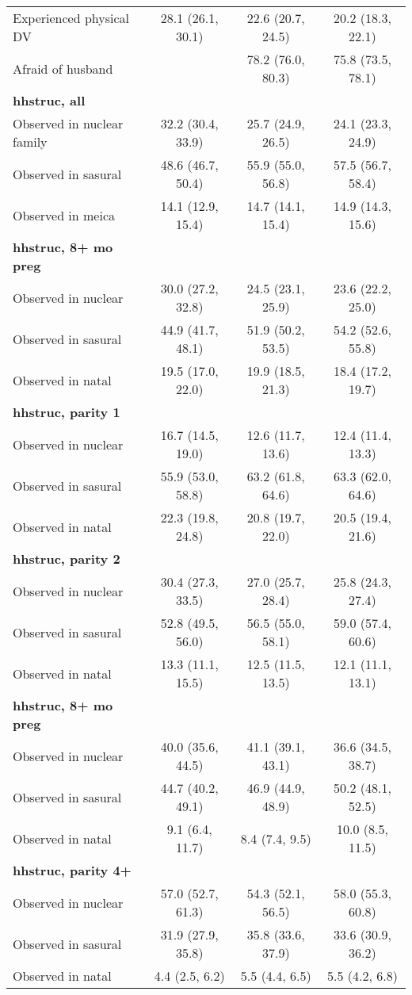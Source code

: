 \begin{tabular}{lccc}
Experienced physical DV&28.1 (26.1, 30.1)&22.6 (20.7, 24.5)&20.2 (18.3, 22.1)\\
Afraid of husband&&78.2 (76.0, 80.3)&75.8 (73.5, 78.1)\\
\textbf{hhstruc, all}&&&\\
Observed in nuclear family&32.2 (30.4, 33.9)&25.7 (24.9, 26.5)&24.1 (23.3, 24.9)\\
Observed in sasural&48.6 (46.7, 50.4)&55.9 (55.0, 56.8)&57.5 (56.7, 58.4)\\
Observed in meica&14.1 (12.9, 15.4)&14.7 (14.1, 15.4)&14.9 (14.3, 15.6)\\
\textbf{hhstruc, 8+ mo preg}&&&\\
Observed in nuclear&30.0 (27.2, 32.8)&24.5 (23.1, 25.9)&23.6 (22.2, 25.0)\\
Observed in sasural&44.9 (41.7, 48.1)&51.9 (50.2, 53.5)&54.2 (52.6, 55.8)\\
Observed in natal&19.5 (17.0, 22.0)&19.9 (18.5, 21.3)&18.4 (17.2, 19.7)\\
\textbf{hhstruc, parity 1}&&&\\
Observed in nuclear&16.7 (14.5, 19.0)&12.6 (11.7, 13.6)&12.4 (11.4, 13.3)\\
Observed in sasural&55.9 (53.0, 58.8)&63.2 (61.8, 64.6)&63.3 (62.0, 64.6)\\
Observed in natal&22.3 (19.8, 24.8)&20.8 (19.7, 22.0)&20.5 (19.4, 21.6)\\
\textbf{hhstruc, parity 2}&&&\\
Observed in nuclear&30.4 (27.3, 33.5)&27.0 (25.7, 28.4)&25.8 (24.3, 27.4)\\
Observed in sasural&52.8 (49.5, 56.0)&56.5 (55.0, 58.1)&59.0 (57.4, 60.6)\\
Observed in natal&13.3 (11.1, 15.5)&12.5 (11.5, 13.5)&12.1 (11.1, 13.1)\\
\textbf{hhstruc, 8+ mo preg}&&&\\
Observed in nuclear&40.0 (35.6, 44.5)&41.1 (39.1, 43.1)&36.6 (34.5, 38.7)\\
Observed in sasural&44.7 (40.2, 49.1)&46.9 (44.9, 48.9)&50.2 (48.1, 52.5)\\
Observed in natal&9.1 (6.4, 11.7)&8.4 (7.4, 9.5)&10.0 (8.5, 11.5)\\
\textbf{hhstruc, parity 4+}&&&\\
Observed in nuclear&57.0 (52.7, 61.3)&54.3 (52.1, 56.5)&58.0 (55.3, 60.8)\\
Observed in sasural&31.9 (27.9, 35.8)&35.8 (33.6, 37.9)&33.6 (30.9, 36.2)\\
Observed in natal&4.4 (2.5, 6.2)&5.5 (4.4, 6.5)&5.5 (4.2, 6.8)\\
\bottomrule
\end{tabular}
